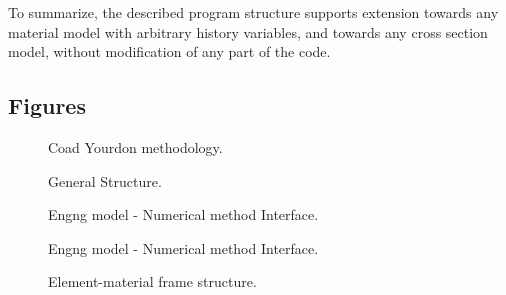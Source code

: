\begin{htmlonly}
\begin{center}
To summarize, the described  program structure supports extension
towards any material model with arbitrary history variables, and
towards any cross section model, without modification of any part of
the code. 

\begin{htmlonly}
\section{Figures}
\end{htmlonly}

\vspace*{-10mm}
\begin{figure}[ht]
\begin{center}\end{center}
\caption{Coad Yourdon methodology.}
\label{coyo}
\end{figure}


\begin{figure}[tb]
\begin{center}\end{center}
\caption{General Structure.}
\label{genstructfig}
\end{figure}


\begin{figure}[tb]
\begin{center}\end{center}
\caption{Engng model - Numerical method Interface.}
\label{engngNummet1fig}
\end{figure}



\begin{figure}[tb]
\begin{center}\end{center}
\caption{Engng model - Numerical method Interface.}
\label{engngNummet2fig}
\end{figure}



\begin{figure}[tb]
\begin{center}\end{center}
\caption{Element-material frame  structure.}
\label{materelementFrame1}
\end{figure}


\end{center}
\end{htmlonly}
